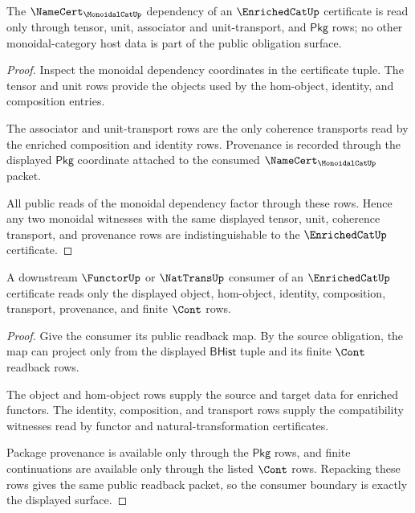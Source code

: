 \begin{theorem}\label{thm:enrichedcat-monoidal-category-boundary}
The $\NameCert_{\MonoidalCatUp}$ dependency of an $\EnrichedCatUp$ certificate is
read only through tensor, unit, associator and unit-transport, and
$\mathsf{Pkg}$ rows; no other monoidal-category host data is part of the public
obligation surface.
\end{theorem}
\begin{proof}
Inspect the monoidal dependency coordinates in the certificate tuple. The tensor
and unit rows provide the objects used by the hom-object, identity, and
composition entries.

The associator and unit-transport rows are the only coherence transports read by
the enriched composition and identity rows. Provenance is recorded through the
displayed $\mathsf{Pkg}$ coordinate attached to the consumed
$\NameCert_{\MonoidalCatUp}$ packet.

All public reads of the monoidal dependency factor through these rows. Hence any
two monoidal witnesses with the same displayed tensor, unit, coherence
transport, and provenance rows are indistinguishable to the $\EnrichedCatUp$
certificate.
\end{proof}

\begin{theorem}\label{thm:enrichedcat-consumer-readback-boundary}
A downstream $\FunctorUp$ or $\NatTransUp$ consumer of an $\EnrichedCatUp$
certificate reads only the displayed object, hom-object, identity, composition,
transport, provenance, and finite $\Cont$ rows.
\end{theorem}
\begin{proof}
Give the consumer its public readback map. By the source obligation, the map can
project only from the displayed $\mathsf{BHist}$ tuple and its finite $\Cont$
readback rows.

The object and hom-object rows supply the source and target data for enriched
functors. The identity, composition, and transport rows supply the compatibility
witnesses read by functor and natural-transformation certificates.

Package provenance is available only through the $\mathsf{Pkg}$ rows, and finite
continuations are available only through the listed $\Cont$ rows. Repacking
these rows gives the same public readback packet, so the consumer boundary is
exactly the displayed surface.
\end{proof}


